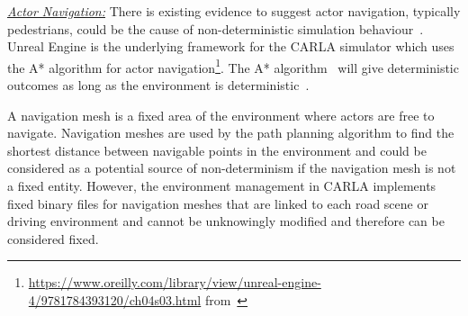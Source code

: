 \documentclass[letterpaper, 10 pt, journal, twoside]{IEEEtran}
\begin{document}


\noindent\underline{\textit{Actor Navigation:}}
There is existing evidence to suggest actor navigation, typically pedestrians, could be the cause of non-deterministic simulation behaviour~\cite{CARLABenchmark}.
% 
Unreal Engine is the underlying framework for the CARLA simulator which uses the A* algorithm for actor navigation\footnote{\url{https://www.oreilly.com/library/view/unreal-engine-4/9781784393120/ch04s03.html} from~\cite{newton2016unreal}}.
%
The A* algorithm~\cite{AStarBook} will give deterministic outcomes as long as the environment is deterministic~\cite{AirsimUnrealArticle, UnrealAIDocumentation}. 

A navigation mesh is a fixed area of the environment where actors are free to navigate.
%
Navigation meshes are used by the path planning algorithm to find the shortest distance between navigable points in the environment and could be considered as a potential source of non-determinism if the navigation mesh is not a fixed entity. %
%
However, the environment management in CARLA implements fixed binary files for navigation meshes that are linked to each road scene or driving environment and cannot be unknowingly modified and therefore can be considered fixed. 
\end{document}
